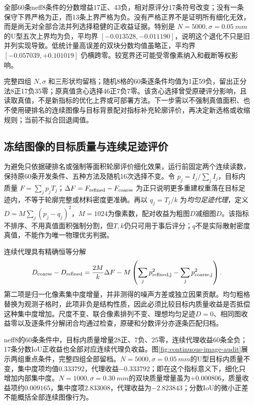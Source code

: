 \documentclass[UTF8,fontset=none,zihao=-4,a4paper]{ctexart}
\begin{document}
全部60条neff8条件的分数增益17正、43负，相对原评分17条符号改变；没有一条保守下界严格为正，而13条上界严格为负。没有严格正界不是证明所有细化无效，而是尚无对全部合法并列选择稳健的正收益证据。特别是 $N=5000,\sigma=\SI{0.05}{mm}$ 的U型五次上界均为负，平均界 $[-0.013528,-0.011190]$，说明这个退化不只是旧并列实现导致。低统计量高误差的双块分数均值虽略正，平均界 $[-0.057039,+0.101019]$ 仍横跨零。较宽界还可能受零像素纳入和截断等权影响。

完整四组 $N,\sigma$ 和三形状均留档；随机8格的60条逐条件均值为1正59负，留出正分法8正17负35零；原真值贪心选择46正7负7零。该贪心选择曾受原硬评分影响，且读取真值，不是新指标的优化上界或可部署方法。下一步需以不强制真值面积、也不使用硬排名的连续图像与目标背景配对指标补充轮廓评价，再决定新选格或收缩规则；当前不拟合回退阈值。

\subsection{冻结图像的目标质量与连续足迹评价}
为避免只依据硬排名或强制等面积轮廓评价细化效果，运行前固定两个连续读数，保持原60条开发条件、五种方法及随机16次选择不变。令 $p_j=I_j/\sum_jI_j$，目标内质量 $F=\sum_jp_jT_j$；$\Delta F=F_{\rm refined}-F_{\rm coarse}$ 为正只说明更多重建权重落在目标足迹内，不等于轮廓完整或材料密度更准确。再以 $q_j=T_j/k$ 为\emph{均匀足迹代理}，定义 $D=M\sum_j(p_j-q_j)^2$，$M=1024$为像素数，配对收益为粗图$D$减细图$D$。该指标不排序、不用真值面积强制分割，但$T,k$仍只可用于事后评分；$q$不是实际散射密度真值，不能作为唯一物理优劣判据。

连续代理具有精确恒等分解
\begin{equation}
D_{\rm coarse}-D_{\rm refined}
=\frac{2M}{k}\Delta F-M\left(\sum_jp_{\rm refined,j}^2-\sum_jp_{\rm coarse,j}^2\right).
\end{equation}
第二项是归一化像素集中度增量，并非测得的噪声方差或独立因果贡献。均匀粗格替换为观测子格时，此项非负是结构性质，因此必须比较目标内质量收益是否抵偿这种集中度增加。尺度不变、联合像素排列不变、理想均匀足迹$D=0$、相同图收益零以及逐条件分解闭合均通过检查，原硬和分数评分亦逐条匹配归档。

neff8的60条条件中，目标内质量增量28正、7负、25零，连续代理收益60条全负；17条分数IoU正收益也全部对应连续代理负收益。图\ref{fig:continuous-image-audit}展示两组重点条件，完整四组全部留档。$N=5000,\sigma=\SI{0.05}{mm}$的U型目标内质量不变，集中度项均值$0.333792$，代理收益$-0.333792$；即在这个指标意义下，细化只增加内部集中度。$N=1000,\sigma=\SI{0.30}{mm}$的双块质量增量虽为$+0.000806$，质量收益项约$0.009165$，集中度项$2.833008$，代理收益为$-2.823843$；分数IoU的微小正差不能概括全部连续图像行为。
\end{document}
